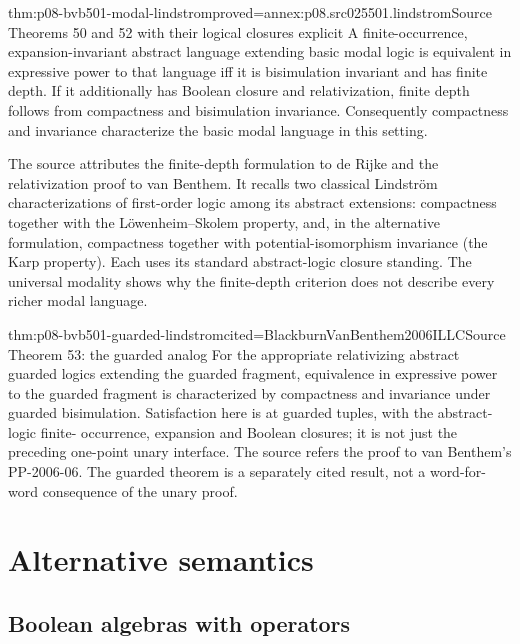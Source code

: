 \begin{hbtheorem}{thm:p08-bvb501-modal-lindstrom}{proved=annex:p08.src025501.lindstrom}{Source Theorems 50 and 52 with their logical closures explicit}
A finite-occurrence, expansion-invariant abstract language extending
basic modal logic is equivalent in expressive power to that language
iff it is bisimulation invariant and has finite depth. If it additionally
has Boolean closure and relativization, finite depth follows from
compactness and bisimulation invariance. Consequently compactness and
invariance characterize the basic modal language in this setting.
\end{hbtheorem}

The source attributes the finite-depth formulation to de Rijke and the
relativization proof to van Benthem. It recalls two classical
Lindstr\"om characterizations of first-order logic among its abstract
extensions: compactness together with the L\"owenheim--Skolem property,
and, in the alternative formulation, compactness together with
potential-isomorphism invariance (the Karp property). Each uses its
standard abstract-logic closure standing. The universal modality shows
why the finite-depth criterion does not describe every richer modal language.

\begin{hbtheorem}{thm:p08-bvb501-guarded-lindstrom}{cited=BlackburnVanBenthem2006ILLC}{Source Theorem 53: the guarded analog}
For the appropriate relativizing abstract guarded logics extending the
guarded fragment, equivalence in expressive power to the guarded fragment
is characterized by compactness and invariance under guarded bisimulation.
Satisfaction here is at guarded tuples, with the abstract-logic finite-
occurrence, expansion and Boolean closures; it is not just the preceding
one-point unary interface. The source refers the proof to van Benthem's
PP-2006-06. The guarded theorem is a separately cited result, not a
word-for-word consequence of the unary proof.
\end{hbtheorem}

\section{Alternative semantics}
\label{sec:p08-bvb501-alternatives}

\subsection{Boolean algebras with operators}
\label{sec:p08-bvb501-algebra}

